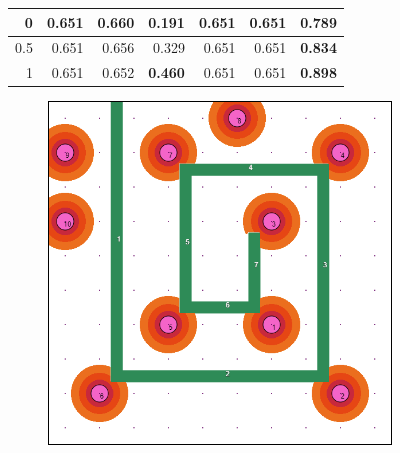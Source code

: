\documentclass[letterpaper, 10 pt, conference]{ieeeconf}
\begin{document}
\begin{figure}[!h]
\begin{minipage}{\columnwidth}
{\begin{tabular}{|rrrrrrr|}
\multicolumn{1}{|r|}{0} & \multicolumn{1}{r|}{0.651} & \multicolumn{1}{r|}{\textbf{0.660}} & \multicolumn{1}{r|}{0.191} & \multicolumn{1}{r|}{0.651} & \multicolumn{1}{r|}{0.651} & \textbf{0.789} \\ \hline
\multicolumn{1}{|r|}{0.5} & \multicolumn{1}{r|}{0.651} & \multicolumn{1}{r|}{0.656} & \multicolumn{1}{r|}{0.329} & \multicolumn{1}{r|}{0.651} & \multicolumn{1}{r|}{0.651} & \textbf{0.834} \\ \hline
\multicolumn{1}{|r|}{1} & \multicolumn{1}{r|}{0.651} & \multicolumn{1}{r|}{0.652} & \multicolumn{1}{r|}{\textbf{0.460}} & \multicolumn{1}{r|}{0.651} & \multicolumn{1}{r|}{0.651} & \textbf{0.898} \\ \hline
\end{tabular}%
}
\vspace{3mm}
\end{minipage}
\centering
\begin{subfigure}[t]{0.3\columnwidth}
    \centering
    \includegraphics[width=\columnwidth]{Figures/MazeRange50.png}
    \caption{}
\end{subfigure}%
\hfill
\begin{subfigure}[t]{0.3\columnwidth}
    \centering

\end{subfigure}
\end{figure}
\end{document}
